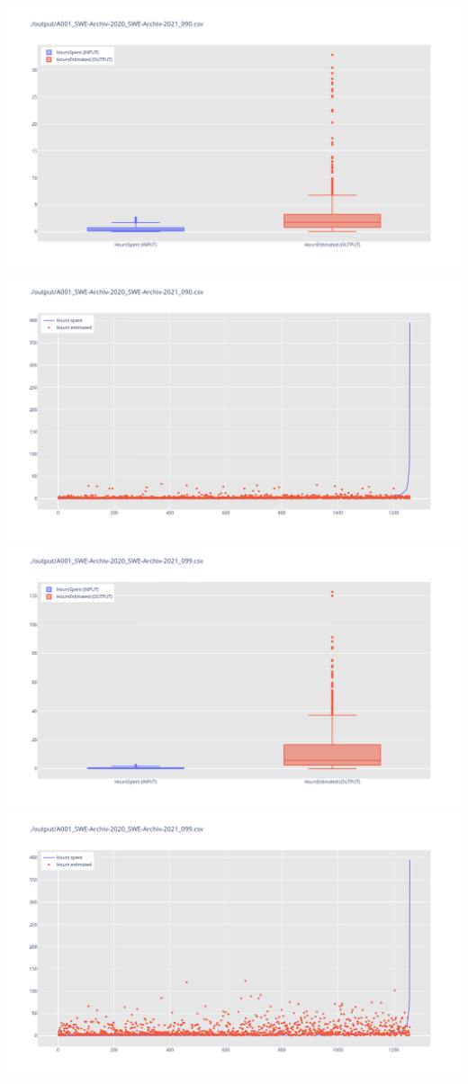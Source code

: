 \includegraphics[width=\textwidth]{Scripts/output/A001_SWE-Archiv-2020_SWE-Archiv-2021_090.csv.png}
\includegraphics[width=\textwidth]{Scripts/output/A001_SWE-Archiv-2020_SWE-Archiv-2021_090.csv.scatter.png}
\includegraphics[width=\textwidth]{Scripts/output/A001_SWE-Archiv-2020_SWE-Archiv-2021_099.csv.png}
\includegraphics[width=\textwidth]{Scripts/output/A001_SWE-Archiv-2020_SWE-Archiv-2021_099.csv.scatter.png}
